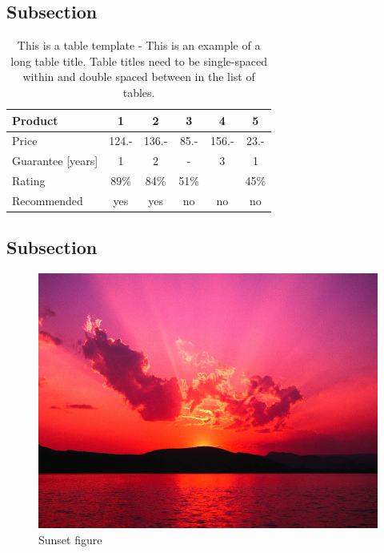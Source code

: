 \subsection{Subsection}
\begin{table}[H]
\centering
\caption{This is a table template - This is an example of a long table title.  Table titles need to be single-spaced within and double spaced between in the list of tables.}
\begin{tabular}{|l|c|c|c|c|c|}
\hline
Product & 1 & 2 & 3 & 4 & 5\\
\hline
Price & 124.- & 136.- & 85.- & 156.- & 23.-\\
Guarantee [years] & 1 & 2 & - & 3 & 1\\
Rating & 89\% & 84\% & 51\% & & 45\%\\
\hline
\hline
Recommended & yes & yes & no & no & no\\
\hline
\end{tabular}
\label{tab:template1}
\end{table}


\subsection{Subsection}
\begin{figure}[H]
\centering
\includegraphics[scale=.50]{Sunset.jpg}
\caption{Sunset figure}
\label{fig:sunset-fig2}
\end{figure}
